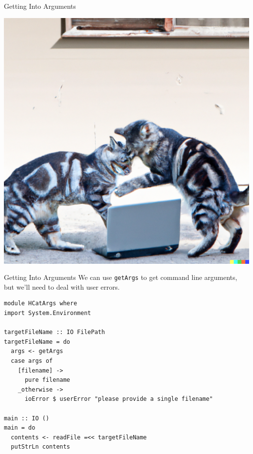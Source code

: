 \documentclass[10pt, presentation, colorlinks]{beamer}
\begin{document}
\begin{frame}[label={sec:orgc4d88dc}]{Getting Into Arguments}
\begin{center}
\includegraphics[height=0.6\textheight]{./img/arguments.png}
\end{center}
\end{frame}

\begin{frame}[label={sec:org2510d4e},fragile]{Getting Into Arguments}
 We can use \alert{\texttt{getArgs}} to get command line arguments, but we'll need to
deal with user errors.

\bigskip
\pause

\begin{verbatim}
module HCatArgs where
import System.Environment

targetFileName :: IO FilePath
targetFileName = do
  args <- getArgs
  case args of
    [filename] ->
      pure filename
    _otherwise ->
      ioError $ userError "please provide a single filename"

main :: IO ()
main = do
  contents <- readFile =<< targetFileName
  putStrLn contents
\end{verbatim}
\end{frame}
\end{document}
